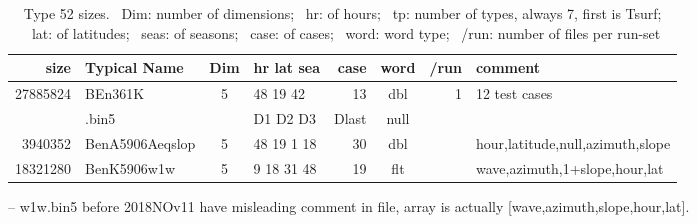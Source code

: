 \documentclass{article}
\begin{document}
\begin{table} [!h]
\caption[Type 52 sizes]{Type 52 sizes. \  Dim: number of dimensions; \ hr: of hours;  \ tp: number of types, always 7, first is Tsurf; \ lat: of latitudes; \ seas: of seasons; \ case: of cases; \ word: word type; \ /run: number of files per run-set}
\begin{center}
\begin{tabular}{| r l c |  l r c r | l | } \hline \hline
size     & Typical Name & Dim & hr lat sea & case & word & /run & comment \\ \hline
27885824 & BEn361K & 5   & 48 19 42    & 13 & dbl &  1  & 12 test cases \\
 & .bin5 &  & D1 D2 D3 & Dlast & null& \\ \hline
3940352 & BenA5906Aeqslop & 5 & 48 19 1 18 & 30 & dbl & & hour,latitude,null,azimuth,slope \\
18321280 & BenK5906w1w  &  5 &  9 18 31 48 & 19 & flt & & wave,azimuth,1+slope,hour,lat \\ \hline
\end{tabular} \end{center} \end{table}
-- w1w.bin5 before 2018NOv11 have misleading comment in file, array is actually [wave,azimuth,slope,hour,lat].
\end{document}
